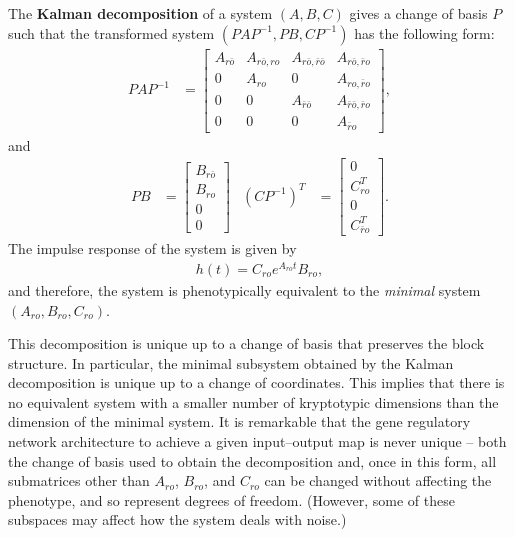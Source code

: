 \documentclass{article}
\newcommand{\ro}{{ro}}
\newcommand{\nro}{{\bar{r}o}}
\newcommand{\rno}{{r\bar{o}}}
\newcommand{\nrno}{{\bar{r}\bar{o}}}
\newcommand{\1}{\mathbbm{1}}
\begin{document}
The \textbf{Kalman decomposition} of a system $(A,B,C)$  
gives a change of basis $P$ such that
the transformed system $(PAP^{-1},PB,CP^{-1})$  has the following form:
\begin{align*}
       PAP^{-1}
       &=
       \left[ \begin{array}{cccc}
           A_{\rno} & A_{\rno,\ro} & A_{\rno,\nrno} & A_{\rno,\nro} \\
           0 & A_{\ro} & 0 & A_{\ro,\nro} \\
           0 & 0 & A_{\nrno} & A_{\nrno,\nro} \\
          0 & 0 & 0 & A_{\nro}
       \end{array} \right] ,
\end{align*}
and
\begin{align*}
     PB
     &=
    \left[ \begin{array}{cccc}
         B_{\rno} \\
         B_{\ro} \\
         0 \\
         0 
   \end{array} \right] 
   &
   (CP^{-1})^T
   &=
   \left[ \begin{array}{cccc}
       0 \\
       C_{\ro}^T \\
       0 \\
       C_{\nro}^T
   \end{array} \right] .
\end{align*}
The impulse response of the system is given by
\begin{align*}
      h(t) = C_{\ro} e^{A_{\ro} t} B_{\ro},
\end{align*}
and therefore, the system is phenotypically equivalent to the \emph{minimal} system $(A_{\ro}, B_{\ro}, C_{\ro})$.

This decomposition is unique up to a change of basis that preserves the block structure.
In particular, 
the minimal subsystem obtained by the Kalman decomposition
is unique up to a change of coordinates.
This implies that there is no equivalent system with a smaller number of kryptotypic dimensions
than the dimension of the minimal system.
It is remarkable that the gene regulatory network architecture to achieve a given input--output map is never unique --
both the change of basis used to obtain the decomposition
and, once in this form, all submatrices other than $A_{\ro}$, $B_{\ro}$, and $C_{\ro}$ can be changed without affecting the phenotype,
and so represent degrees of freedom.
(However, some of these subspaces may affect how the system deals with noise.)
\end{document}
